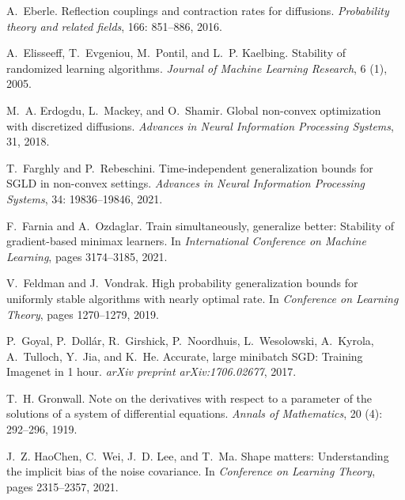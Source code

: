 \documentclass{article}
\begin{document}
\begin{thebibliography}{47}
A.~Eberle.
\newblock Reflection couplings and contraction rates for diffusions.
\newblock \emph{Probability theory and related fields}, 166: 851--886, 2016.

A.~Elisseeff, T.~Evgeniou, M.~Pontil, and L.~P. Kaelbing.
\newblock Stability of randomized learning algorithms.
\newblock \emph{Journal of Machine Learning Research}, 6 (1), 2005.

M.~A. Erdogdu, L.~Mackey, and O.~Shamir.
\newblock Global non-convex optimization with discretized diffusions.
\newblock \emph{Advances in Neural Information Processing Systems}, 31, 2018.

T.~Farghly and P.~Rebeschini.
\newblock Time-independent generalization bounds for {SGLD} in non-convex settings.
\newblock \emph{Advances in Neural Information Processing Systems}, 34: 19836--19846, 2021.

F.~Farnia and A.~Ozdaglar.
\newblock Train simultaneously, generalize better: Stability of gradient-based minimax learners.
\newblock In \emph{International Conference on Machine Learning}, pages 3174--3185, 2021.

V.~Feldman and J.~Vondrak.
\newblock High probability generalization bounds for uniformly stable algorithms with nearly optimal rate.
\newblock In \emph{Conference on Learning Theory}, pages 1270--1279, 2019.

P.~Goyal, P.~Doll{\'a}r, R.~Girshick, P.~Noordhuis, L.~Wesolowski, A.~Kyrola, A.~Tulloch, Y.~Jia, and K.~He.
\newblock Accurate, large minibatch {SGD}: Training {I}magenet in 1 hour.
\newblock \emph{arXiv preprint arXiv:1706.02677}, 2017.

T.~H. Gronwall.
\newblock Note on the derivatives with respect to a parameter of the solutions of a system of differential equations.
\newblock \emph{Annals of Mathematics}, 20 (4): 292--296, 1919.

J.~Z. HaoChen, C.~Wei, J.~D. Lee, and T.~Ma.
\newblock Shape matters: Understanding the implicit bias of the noise covariance.
\newblock In \emph{Conference on Learning Theory}, pages 2315--2357, 2021.


\end{thebibliography}
\end{document}
